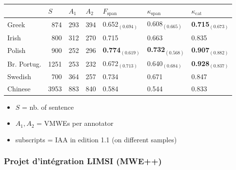 \documentclass[xcolor=dvipsnames]{beamer}
\begin{document}
\begin{frame}
\begin{frame}[label={iaa}]
\setlength{\tabcolsep}{0.5mm}
\begin{tabular}{@{~}l@{~~}l@{~~}l@{~~}l@{~~}l@{~~}l@{~~}l@{~}}
\hline\hline
& $S$& $A_1$&$A_2$& $F_{\text{span}}$ &$\kappa_{\text{span}}$&  $\kappa_{\text{cat}}$\\
\hline
Greek       & ~874 & 293 & 394 & 0.652$_{(0.694)}$ & 0.608$_{(0.665)}$ & \textbf{0.715}$_{(0.673)}$ \\
Irish       & ~800   & 312 & 270 & 0.715 & 0.663 & 0.835 \\
Polish      & ~900 & 252 & 296 & \textbf{0.774}$_{(0.619)}$ & \textbf{0.732}$_{(0.568)}$ & \textbf{0.907}$_{(0.882)}$ \\
Br. Portug.  & 1251 & 253 & 232 & 0.672$_{(0.713)}$ & 0.640$_{(0.684)}$ & \textbf{0.928}$_{(0.837)}$ \\
Swedish     & ~700 & 364 & 257 & 0.734 & 0.671 & 0.847 \\
Chinese    & 3953 & 883 & 840 & 0.584 & 0.544 & 0.833 \\
\hline\hline
\end{tabular}

\begin{itemize}
\item $S$ = nb. of sentence
\item $A_1, A_2$ = VMWEs per annotator
\item subscripts = IAA in edition 1.1 (on different samples)
\end{itemize}

\end{frame}

\begin{frame}
   \frametitle{Projet d'intégration LIMSI (MWE++)}


\end{frame}
\end{frame}
\end{document}
